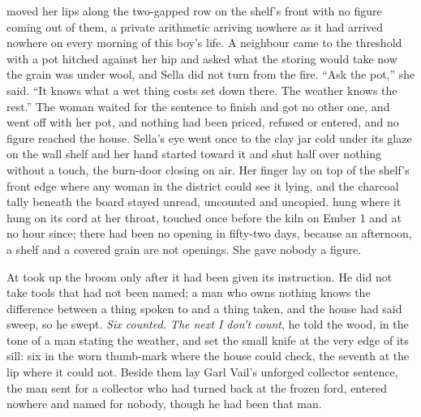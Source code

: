  moved her lips along the two-gapped row on the shelf's front with no figure coming out of them, a private arithmetic arriving nowhere as it had arrived nowhere on every morning of this boy's life. A neighbour came to the threshold with a pot hitched against her hip and asked what the storing would take now the grain was under wool, and Sella did not turn from the fire. “Ask the pot,” she said. “It knows what a wet thing costs set down there. The weather knows the rest.” The woman waited for the sentence to finish and got no other one, and went off with her pot, and nothing had been priced, refused or entered, and no figure reached the house. Sella's eye went once to the clay jar cold under its glaze on the wall shelf and her hand started toward it and shut half over nothing without a touch, the burn-door closing on air. Her finger lay on top of the shelf's front edge where any woman in the district could see it lying, and the charcoal tally beneath the board stayed unread, uncounted and uncopied.  hung where it hung on its cord at her throat, touched once before the kiln on Ember 1 and at no hour since; there had been no opening in fifty-two days, because an afternoon, a shelf and a covered grain are not openings. She gave nobody a figure.

\scenebreak

At   took up the broom only after it had been given its instruction. He did not take tools that had not been named; a man who owns nothing knows the difference between a thing spoken to and a thing taken, and the house had said sweep, so he swept. \emph{Six counted. The next I don't count}, he told the wood, in the tone of a man stating the weather, and set the small knife at the very edge of its sill: six in the worn thumb-mark where the house could check, the seventh at the lip where it could not. Beside them lay Garl Vail's unforged collector sentence, the man sent for a collector who had turned back at the frozen ford, entered nowhere and named for nobody, though he had been that man.

